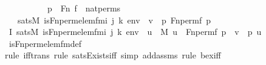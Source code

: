 \begin{isabellebody}
\ \ \ \ \ \ \ \ \ \ {\isachardoublequoteopen}p\ {\isasymin}\ Fn{\isachardoublequoteclose}\ {\isachardoublequoteopen}f\ {\isasymin}\ nat{\isacharunderscore}{\kern0pt}perms{\isachardoublequoteclose}\isanewline
\ \ \ {\isachardoublequoteopen}sats{\isacharparenleft}{\kern0pt}M{\isacharcomma}{\kern0pt}\ is{\isacharunderscore}{\kern0pt}Fn{\isacharunderscore}{\kern0pt}perm{\isacharprime}{\kern0pt}{\isacharunderscore}{\kern0pt}elem{\isacharunderscore}{\kern0pt}fm{\isacharparenleft}{\kern0pt}i{\isacharcomma}{\kern0pt}\ j{\isacharcomma}{\kern0pt}\ k{\isacharparenright}{\kern0pt}{\isacharcomma}{\kern0pt}\ env{\isacharparenright}{\kern0pt}\ {\isasymlongleftrightarrow}\ v\ {\isacharequal}{\kern0pt}\ {\isacharless}{\kern0pt}p{\isacharcomma}{\kern0pt}\ Fn{\isacharunderscore}{\kern0pt}perm{\isacharparenleft}{\kern0pt}f{\isacharcomma}{\kern0pt}\ p{\isacharparenright}{\kern0pt}{\isachargreater}{\kern0pt}{\isachardoublequoteclose}\ \isanewline
%
\isadelimproof
%
\endisadelimproof
%
\isatagproof
{}\isamarkupfalse%
\ {\isacharminus}{\kern0pt}\ \isanewline
\ \ \isamarkupfalse%
\ I{}{\isacharcolon}{\kern0pt}\ {\isachardoublequoteopen}sats{\isacharparenleft}{\kern0pt}M{\isacharcomma}{\kern0pt}\ is{\isacharunderscore}{\kern0pt}Fn{\isacharunderscore}{\kern0pt}perm{\isacharprime}{\kern0pt}{\isacharunderscore}{\kern0pt}elem{\isacharunderscore}{\kern0pt}fm{\isacharparenleft}{\kern0pt}i{\isacharcomma}{\kern0pt}\ j{\isacharcomma}{\kern0pt}\ k{\isacharparenright}{\kern0pt}{\isacharcomma}{\kern0pt}\ env{\isacharparenright}{\kern0pt}\ {\isasymlongleftrightarrow}\ {\isacharparenleft}{\kern0pt}{\isasymexists}u\ {\isasymin}\ M{\isachardot}{\kern0pt}\ u\ {\isacharequal}{\kern0pt}\ Fn{\isacharunderscore}{\kern0pt}perm{\isacharparenleft}{\kern0pt}f{\isacharcomma}{\kern0pt}\ p{\isacharparenright}{\kern0pt}\ {\isasymand}\ v\ {\isacharequal}{\kern0pt}\ {\isacharless}{\kern0pt}p{\isacharcomma}{\kern0pt}\ u{\isachargreater}{\kern0pt}{\isacharparenright}{\kern0pt}{\isachardoublequoteclose}\ \isanewline
\ \ \ \ \isamarkupfalse%
\ is{\isacharunderscore}{\kern0pt}Fn{\isacharunderscore}{\kern0pt}perm{\isacharprime}{\kern0pt}{\isacharunderscore}{\kern0pt}elem{\isacharunderscore}{\kern0pt}fm{\isacharunderscore}{\kern0pt}def\isanewline
\ \ \ \ \isamarkupfalse%
{\isacharparenleft}{\kern0pt}rule\ iff{\isacharunderscore}{\kern0pt}trans{\isacharcomma}{\kern0pt}\ rule\ sats{\isacharunderscore}{\kern0pt}Exists{\isacharunderscore}{\kern0pt}iff{\isacharcomma}{\kern0pt}\ simp\ add{\isacharcolon}{\kern0pt}assms{\isacharcomma}{\kern0pt}\ rule\ bex{\isacharunderscore}{\kern0pt}iff{\isacharparenright}{\kern0pt}\isanewline

\end{isabellebody}
